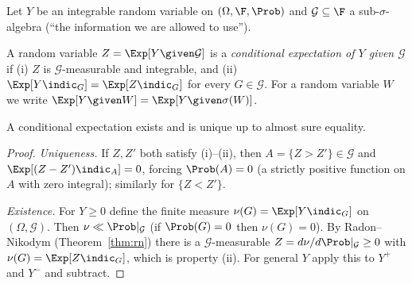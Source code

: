 Let $Y$ be an integrable random variable on $(\Omega,\F,\Prob)$ and $\mathcal G\subseteq\F$ a
sub-$\sigma$-algebra (``the information we are allowed to use'').

\begin{definition}
A random variable $Z=\Exp[Y\given\mathcal G]$ is a \emph{conditional expectation of $Y$ given
$\mathcal G$} if (i) $Z$ is $\mathcal G$-measurable and integrable, and (ii)
$\Exp[Y\indic_G]=\Exp[Z\indic_G]$ for every $G\in\mathcal G$. For a random variable $W$ we write
$\Exp[Y\given W]=\Exp[Y\given\sigma(W)]$.
\end{definition}

\begin{theorem}\label{thm:condexpexists}
A conditional expectation exists and is unique up to almost sure equality.
\end{theorem}
\begin{proof}
\emph{Uniqueness.} If $Z,Z'$ both satisfy (i)--(ii), then $A=\{Z>Z'\}\in\mathcal G$ and
$\Exp[(Z-Z')\indic_A]=0$, forcing $\Prob(A)=0$ (a strictly positive function on $A$ with zero
integral); similarly for $\{Z<Z'\}$.

\emph{Existence.} For $Y\ge0$ define the finite measure $\nu(G)=\Exp[Y\indic_G]$ on
$(\Omega,\mathcal G)$. Then $\nu\ll\Prob|_{\mathcal G}$ (if $\Prob(G)=0$ then $\nu(G)=0$). By
Radon--Nikodym (Theorem~\ref{thm:rn}) there is a $\mathcal G$-measurable $Z=d\nu/d\Prob|_{\mathcal G}\ge0$
with $\nu(G)=\Exp[Z\indic_G]$, which is property (ii). For general $Y$ apply this to
$Y^+$ and $Y^-$ and subtract.
\end{proof}

